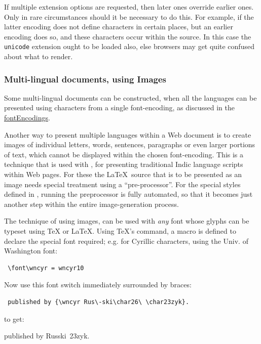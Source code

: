 If multiple extension options are requested, then later ones
override earlier ones.\html{\\}
Only in rare circumstances should it be necessary to do this.
For example, if the latter encoding does not define characters
in certain places, but an earlier encoding does so, and these
characters occur within the source. 
In this case the \texttt{unicode} extension ought to be loaded also,
else browsers may get quite confused about what to render.


\subsubsection{Multi-lingual documents, using Images\label{multilang}}%
%
Some multi-lingual documents can be constructed, when all the languages
can be presented using characters from a single font-encoding,
as discussed in the \hyperref{previous section}{Section~}{}{fontEncodings}.

Another way to present multiple languages within a Web document is to
create images of individual letters, words, sentences, paragraphs
or even larger portions of text, which cannot be displayed within
the chosen font-encoding.
This is a technique that is used with \IndicHTML, for presenting
traditional Indic language scripts within Web pages.
For these the \LaTeX\ source that is to be presented as an image
needs special treatment using a ``pre-processor''. 
For the special styles defined in \IndicHTML, running the preprocessor
is fully automated, so that it becomes just another step 
within the entire image-generation process.

\medskip

The technique of using images, can be used with \emph{any} font 
whose glyphs can be typeset using \TeX{} or \LaTeX. 
Using \TeX's  command, a macro is defined to declare
the special font required; 
e.g. for Cyrillic characters, using the Univ. of Washington font:
\begin{small}
\begin{verbatim}
 \font\wncyr = wncyr10
\end{verbatim}
\end{small}

\noindent
Now use this font switch immediately surrounded by braces:
\begin{small}
\begin{verbatim}
 published by {\wncyr Rus\-ski\char26\ \char23zyk}.
\end{verbatim}
\end{small}
to get:
\begin{center}
 published by {\wncyr Rus\-ski\ \char23zyk}.
\end{center}


